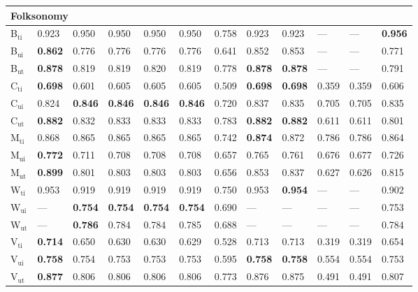 \begin{longtable}{ llllllllllll }
\hline
\multicolumn{12}{|l|}{\textbf{Folksonomy}} \\
\hline
\textsf{B\ensuremath{_{\textrm{ti}}}}               & 0.923 & 0.950 & 0.950 & 0.950 & 0.950 & 0.758 & 0.923 & 0.923 & --- & --- & \bf{0.956} \\
\textsf{B\ensuremath{_{\textrm{ui}}}}               & \bf{0.862} & 0.776 & 0.776 & 0.776 & 0.776 & 0.641 & 0.852 & 0.853 & --- & --- & 0.771 \\
\textsf{B\ensuremath{_{\textrm{ut}}}}               & \bf{0.878} & 0.819 & 0.819 & 0.820 & 0.819 & 0.778 & \bf{0.878} & \bf{0.878} & --- & --- & 0.791 \\
\textsf{C\ensuremath{_{\textrm{ti}}}}               & \bf{0.698} & 0.601 & 0.605 & 0.605 & 0.605 & 0.509 & \bf{0.698} & \bf{0.698} & 0.359 & 0.359 & 0.606 \\
\textsf{C\ensuremath{_{\textrm{ui}}}}               & 0.824 & \bf{0.846} & \bf{0.846} & \bf{0.846} & \bf{0.846} & 0.720 & 0.837 & 0.835 & 0.705 & 0.705 & 0.835 \\
\textsf{C\ensuremath{_{\textrm{ut}}}}               & \bf{0.882} & 0.832 & 0.833 & 0.833 & 0.833 & 0.783 & \bf{0.882} & \bf{0.882} & 0.611 & 0.611 & 0.801 \\
\textsf{M\ensuremath{_{\textrm{ti}}}}               & 0.868 & 0.865 & 0.865 & 0.865 & 0.865 & 0.742 & \bf{0.874} & 0.872 & 0.786 & 0.786 & 0.864 \\
\textsf{M\ensuremath{_{\textrm{ui}}}}               & \bf{0.772} & 0.711 & 0.708 & 0.708 & 0.708 & 0.657 & 0.765 & 0.761 & 0.676 & 0.677 & 0.726 \\
\textsf{M\ensuremath{_{\textrm{ut}}}}               & \bf{0.899} & 0.801 & 0.803 & 0.803 & 0.803 & 0.656 & 0.853 & 0.837 & 0.627 & 0.626 & 0.815 \\
\textsf{W\ensuremath{_{\textrm{ti}}}}               & 0.953 & 0.919 & 0.919 & 0.919 & 0.919 & 0.750 & 0.953 & \bf{0.954} & --- & --- & 0.902 \\
\textsf{W\ensuremath{_{\textrm{ui}}}}               & --- & \bf{0.754} & \bf{0.754} & \bf{0.754} & \bf{0.754} & 0.690 & --- & --- & --- & --- & 0.753 \\
\textsf{W\ensuremath{_{\textrm{ut}}}}               & --- & \bf{0.786} & 0.784 & 0.784 & 0.785 & 0.688 & --- & --- & --- & --- & 0.784 \\
\textsf{V\ensuremath{_{\textrm{ti}}}}               & \bf{0.714} & 0.650 & 0.630 & 0.630 & 0.629 & 0.528 & 0.713 & 0.713 & 0.319 & 0.319 & 0.654 \\
\textsf{V\ensuremath{_{\textrm{ui}}}}               & \bf{0.758} & 0.754 & 0.753 & 0.753 & 0.753 & 0.595 & \bf{0.758} & \bf{0.758} & 0.554 & 0.554 & 0.753 \\
\textsf{V\ensuremath{_{\textrm{ut}}}}               & \bf{0.877} & 0.806 & 0.806 & 0.806 & 0.806 & 0.773 & 0.876 & 0.875 & 0.491 & 0.491 & 0.807 \\


\end{longtable}
